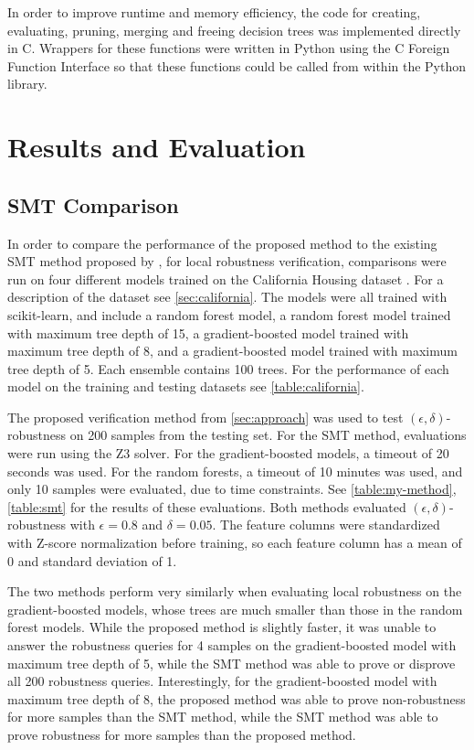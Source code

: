 \documentclass[pageno]{jpaper}
\begin{document}
\begin{doublespacing}
In order to improve runtime and memory efficiency, the code for creating, evaluating, pruning, merging and freeing decision trees was implemented directly in C. Wrappers for these functions were written in Python using the C Foreign Function Interface \cite{cffi} so that these functions could be called from within the Python library.

\section{Results and Evaluation}
\label{sec:results}
\subsection{SMT Comparison}
\label{sec:smt-comp}
In order to compare the performance of the proposed method to the existing SMT method proposed by \cite{einziger}, \cite{nie} for local robustness verification, comparisons were run on four different models trained on the California Housing dataset \cite{california}. For a description of the dataset see \autoref{sec:california}. The models were all trained with scikit-learn, and include a random forest model, a random forest model trained with maximum tree depth of 15, a gradient-boosted model trained with maximum tree depth of 8, and a gradient-boosted model trained with maximum tree depth of 5. Each ensemble contains 100 trees. For the performance of each model on the training and testing datasets see \autoref{table:california}.

The proposed verification method from \autoref{sec:approach} was used to test $(\epsilon, \delta)$-robustness on 200 samples from the testing set. For the SMT method, evaluations were run using the Z3 \cite{z3} solver. For the gradient-boosted models, a timeout of 20 seconds was used. For the random forests, a timeout of 10 minutes was used, and only 10 samples were evaluated, due to time constraints. See \autoref{table:my-method}, \autoref{table:smt} for the results of these evaluations. Both methods evaluated $(\epsilon, \delta)$-robustness with $\epsilon = 0.8$ and $\delta = 0.05$. The feature columns were standardized with Z-score normalization before training, so each feature column has a mean of 0 and standard deviation of 1.

The two methods perform very similarly when evaluating local robustness on the gradient-boosted models, whose trees are much smaller than those in the random forest models. While the proposed method is slightly faster, it was unable to answer the robustness queries for 4 samples on the gradient-boosted model with maximum tree depth of 5, while the SMT method was able to prove or disprove all 200 robustness queries. Interestingly, for the gradient-boosted model with maximum tree depth of 8, the proposed method was able to prove non-robustness for more samples than the SMT method, while the SMT method was able to prove robustness for more samples than the proposed method.


\end{doublespacing}
\end{document}

